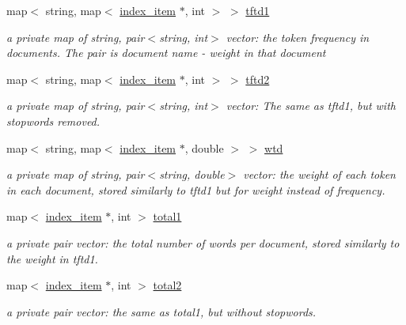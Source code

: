 \begin{DoxyCompactItemize}
\mbox{\label{classindexer_a0139107164efd7e1d8ee95680a8f623e}} 
map$<$ string, map$<$ \hyperlink{classindex__item}{index\+\_\+item} $\ast$, int $>$ $>$ \hyperlink{classindexer_a0139107164efd7e1d8ee95680a8f623e}{tftd1}
\begin{DoxyCompactList}\small\item\em a private map of string, pair$<$string, int$>$ vector\+: the token frequency in documents. The pair is document name -\/ weight in that document \end{DoxyCompactList}\item 
\mbox{\label{classindexer_a1ff1c5347d49058577a4426c566fa869}} 
map$<$ string, map$<$ \hyperlink{classindex__item}{index\+\_\+item} $\ast$, int $>$ $>$ \hyperlink{classindexer_a1ff1c5347d49058577a4426c566fa869}{tftd2}
\begin{DoxyCompactList}\small\item\em a private map of string, pair$<$string, int$>$ vector\+: The same as tftd1, but with stopwords removed. \end{DoxyCompactList}\item 
\mbox{\label{classindexer_a74d1cf4b9a28f2772334d2abadab014d}} 
map$<$ string, map$<$ \hyperlink{classindex__item}{index\+\_\+item} $\ast$, double $>$ $>$ \hyperlink{classindexer_a74d1cf4b9a28f2772334d2abadab014d}{wtd}
\begin{DoxyCompactList}\small\item\em a private map of string, pair$<$string, double$>$ vector\+: the weight of each token in each document, stored similarly to tftd1 but for weight instead of frequency. \end{DoxyCompactList}\item 
\mbox{\label{classindexer_aa8fe5fc7623db3c099e9d1604ffa09bb}} 
map$<$ \hyperlink{classindex__item}{index\+\_\+item} $\ast$, int $>$ \hyperlink{classindexer_aa8fe5fc7623db3c099e9d1604ffa09bb}{total1}
\begin{DoxyCompactList}\small\item\em a private pair vector\+: the total number of words per document, stored similarly to the weight in tftd1. \end{DoxyCompactList}\item 
\mbox{\label{classindexer_a5b4ef5367c4d3f0f35b96c180c67e989}} 
map$<$ \hyperlink{classindex__item}{index\+\_\+item} $\ast$, int $>$ \hyperlink{classindexer_a5b4ef5367c4d3f0f35b96c180c67e989}{total2}
\begin{DoxyCompactList}\small\item\em a private pair vector\+: the same as total1, but without stopwords. \end{DoxyCompactList}\end{DoxyCompactItemize}
